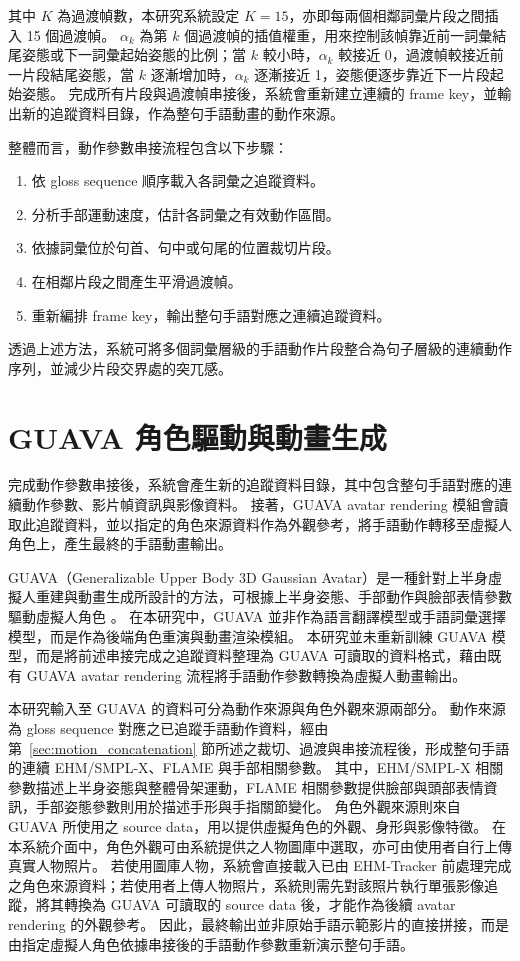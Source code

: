\documentclass[class=NCU_thesis, crop=false]{standalone}
\begin{document}
其中 $K$ 為過渡幀數，本研究系統設定 $K=15$，亦即每兩個相鄰詞彙片段之間插入 15 個過渡幀。
$\alpha_k$ 為第 $k$ 個過渡幀的插值權重，用來控制該幀靠近前一詞彙結尾姿態或下一詞彙起始姿態的比例；當 $k$ 較小時，$\alpha_k$ 較接近 0，過渡幀較接近前一片段結尾姿態，當 $k$ 逐漸增加時，$\alpha_k$ 逐漸接近 1，姿態便逐步靠近下一片段起始姿態。
完成所有片段與過渡幀串接後，系統會重新建立連續的 frame key，並輸出新的追蹤資料目錄，作為整句手語動畫的動作來源。

整體而言，動作參數串接流程包含以下步驟：

\begin{enumerate}
    \item 依 gloss sequence 順序載入各詞彙之追蹤資料。
    \item 分析手部運動速度，估計各詞彙之有效動作區間。
    \item 依據詞彙位於句首、句中或句尾的位置裁切片段。
    \item 在相鄰片段之間產生平滑過渡幀。
    \item 重新編排 frame key，輸出整句手語對應之連續追蹤資料。
\end{enumerate}

透過上述方法，系統可將多個詞彙層級的手語動作片段整合為句子層級的連續動作序列，並減少片段交界處的突兀感。

\section{GUAVA 角色驅動與動畫生成}
\label{sec:guava_avatar_rendering}

完成動作參數串接後，系統會產生新的追蹤資料目錄，其中包含整句手語對應的連續動作參數、影片幀資訊與影像資料。
接著，GUAVA avatar rendering 模組會讀取此追蹤資料，並以指定的角色來源資料作為外觀參考，將手語動作轉移至虛擬人角色上，產生最終的手語動畫輸出。

GUAVA（Generalizable Upper Body 3D Gaussian Avatar）是一種針對上半身虛擬人重建與動畫生成所設計的方法，可根據上半身姿態、手部動作與臉部表情參數驅動虛擬人角色 \cite{zhang2025guava}。
在本研究中，GUAVA 並非作為語言翻譯模型或手語詞彙選擇模型，而是作為後端角色重演與動畫渲染模組。
本研究並未重新訓練 GUAVA 模型，而是將前述串接完成之追蹤資料整理為 GUAVA 可讀取的資料格式，藉由既有 GUAVA avatar rendering 流程將手語動作參數轉換為虛擬人動畫輸出。

本研究輸入至 GUAVA 的資料可分為動作來源與角色外觀來源兩部分。
動作來源為 gloss sequence 對應之已追蹤手語動作資料，經由第~\ref{sec:motion_concatenation} 節所述之裁切、過渡與串接流程後，形成整句手語的連續 EHM/SMPL-X、FLAME 與手部相關參數。
其中，EHM/SMPL-X 相關參數描述上半身姿態與整體骨架運動，FLAME 相關參數提供臉部與頭部表情資訊，手部姿態參數則用於描述手形與手指關節變化。
角色外觀來源則來自 GUAVA 所使用之 source data，用以提供虛擬角色的外觀、身形與影像特徵。
在本系統介面中，角色外觀可由系統提供之人物圖庫中選取，亦可由使用者自行上傳真實人物照片。
若使用圖庫人物，系統會直接載入已由 EHM-Tracker 前處理完成之角色來源資料；若使用者上傳人物照片，系統則需先對該照片執行單張影像追蹤，將其轉換為 GUAVA 可讀取的 source data 後，才能作為後續 avatar rendering 的外觀參考。
因此，最終輸出並非原始手語示範影片的直接拼接，而是由指定虛擬人角色依據串接後的手語動作參數重新演示整句手語。
\end{document}
